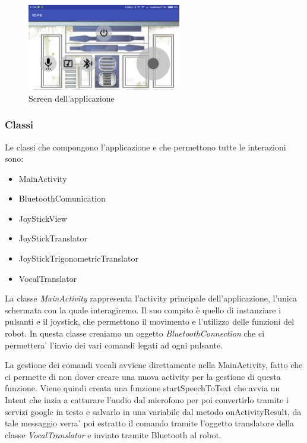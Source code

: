 \documentclass[12pt]{article}
\newcommand{\imgszland}{0.6\textwidth}
\begin{document}
\begin{figure}[h]
\includegraphics[width=\imgszland]{screenapp}
\centering
\caption{Screen dell'applicazione}
\label{fig:screen}
\end{figure}

\newpage
\subsubsection{Classi}

Le classi che compongono l'applicazione e che permettono tutte le interazioni sono:
\begin{itemize}
\item MainActivity 
\item BluetoothComunication
\item JoyStickView
\item JoyStickTranslator
\item JoyStickTrigonometricTranslator
\item VocalTranslator
\end{itemize}


La classe \emph{MainActivity} rappresenta l'activity principale dell'applicazione, l'unica schermata con la quale interagiremo. 
Il suo compito è quello di instanziare i pulsanti e il joystick, che permettono il movimento e l'utilizzo delle funzioni del robot.
In questa classe creaiamo un oggetto \emph{BluetoothConnection} che ci permettera' l'invio dei vari comandi legati ad ogni pulsante.

La gestione dei comandi vocali avviene direttamente nella MainActivity, fatto che ci permette di non dover creare una nuova activity per la gestione di questa funzione. Viene quindi creata una funzione startSpeechToText che avvia un Intent che inzia a catturare l'audio dal microfono per poi convertirlo tramite i servizi google in testo e salvarlo in una variabile dal metodo onActivityResult, da tale messaggio verra' poi estratto il comando tramite l'oggetto translatore della classe \emph{VocalTranslator} e inviato tramite Bluetooth al robot.
\end{document}
